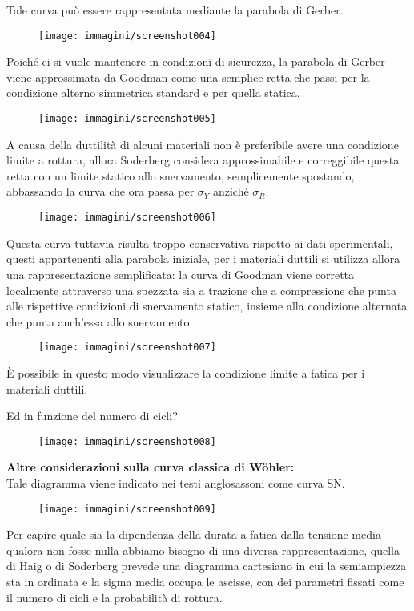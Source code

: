 \documentclass{article}
\begin{document}
\begin{adjustwidth}{2in}{}
			Tale curva può essere rappresentata mediante la parabola di Gerber.
			\begin{figure}[H]
				\centering
				\texttt{[image: immagini/screenshot004]}
				\label{fig:screenshot004}
			\end{figure}			 
			Poiché ci si vuole mantenere in condizioni di sicurezza, la parabola di Gerber viene approssimata da Goodman come una semplice retta che passi per la condizione alterno simmetrica standard e per quella statica. 
			\begin{figure}[H]
				\centering
				\texttt{[image: immagini/screenshot005]}
				\label{fig:screenshot005}
			\end{figure}						
			A causa della duttilità di alcuni materiali non è preferibile avere una condizione limite a rottura, allora Soderberg considera approssimabile e correggibile questa retta con un limite statico allo snervamento, semplicemente spostando, abbassando la curva che ora passa per $\sigma_Y$ anziché $\sigma_R$.
			\begin{figure}[H]
				\centering
				\texttt{[image: immagini/screenshot006]}
				\label{fig:screenshot006}
			\end{figure}
			Questa curva tuttavia risulta troppo conservativa rispetto ai dati sperimentali, questi appartenenti alla parabola iniziale, per i materiali duttili si utilizza allora una rappresentazione semplificata: la curva di Goodman viene corretta localmente attraverso una spezzata sia a trazione che a compressione che punta alle rispettive condizioni di snervamento statico, insieme alla condizione alternata che punta anch'essa allo snervamento
			\begin{figure}[H]
				\centering
				\texttt{[image: immagini/screenshot007]}
				\label{fig:screenshot007}
			\end{figure}			
			È possibile in questo modo visualizzare la condizione limite a fatica per i materiali duttili. \newline
			 
			Ed in funzione del numero di cicli? 
			\begin{figure}[H]
				\centering
				\texttt{[image: immagini/screenshot008]}
				\label{fig:screenshot008}
			\end{figure}
\newpage			
			\textbf{{\large Altre considerazioni sulla curva classica di Wöhler:}}\\			
			Tale diagramma viene indicato nei testi anglosassoni come curva SN. 
			\begin{figure}[H]
				\centering
				\texttt{[image: immagini/screenshot009]}
				\label{fig:screenshot009}
			\end{figure}
			Per capire quale sia la dipendenza della durata a fatica dalla tensione media qualora non fosse nulla abbiamo bisogno di una diversa rappresentazione, quella di Haig o di Soderberg prevede una diagramma cartesiano in cui la semiampiezza sta in ordinata e la sigma media occupa le ascisse, con dei parametri fissati come il numero di cicli e la probabilità di rottura.
			

\end{adjustwidth}
\end{document}
